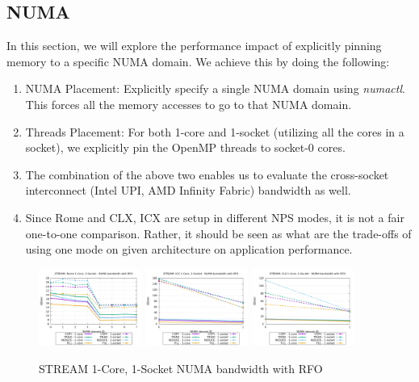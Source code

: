 \documentclass{article}
\begin{document}
\subsection{NUMA}
In this section, we will explore the performance impact of explicitly pinning memory to a specific NUMA domain. We achieve this by doing the following: 
\begin{enumerate}
\item NUMA Placement: Explicitly specify a single NUMA domain using \textit{numactl}. This forces all the memory accesses to go to that NUMA domain.
\item Threads Placement: For both 1-core and 1-socket (utilizing all the cores in a socket), we explicitly pin the OpenMP threads to socket-0 cores. 
\item The combination of the above two enables us to evaluate the cross-socket interconnect (Intel UPI, AMD Infinity Fabric) bandwidth as well.
\item Since Rome and CLX, ICX are setup in different NPS modes, it is not a fair one-to-one comparison. Rather, it should be seen as what are the trade-offs of using one mode on given architecture on application performance.
\end{enumerate}
 
\begin{figure}[!ht]
    \centering
    \includegraphics[width=0.3\textwidth]{../data/rome-clx-icx/mem_bw_numa/Rome_numa_nps4_compact_rfo}
    \includegraphics[width=0.3\textwidth]{../data/rome-clx-icx/mem_bw_numa/ICX_numa_nps1_compact_rfo}
    \includegraphics[width=0.3\textwidth]{../data/rome-clx-icx/mem_bw_numa/CLX_numa_nps1_compact_rfo}
    \caption{STREAM 1-Core, 1-Socket NUMA bandwidth with RFO}
    \label{figure:mem_bw_numa_rfo}
\end{figure}
\end{document}
